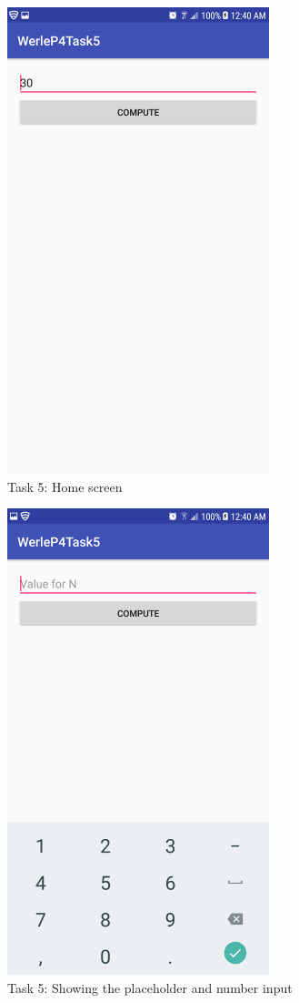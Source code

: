 \documentclass[11pt]{article}
\begin{document}
		\begin{figure}[ht]
			\includegraphics[width=3in]{img/t5s1.png}
			\centering
			\caption{Task 5: Home screen}
		\end{figure}
		\begin{figure}[ht]
			\includegraphics[width=3in]{img/t5s2.png}
			\centering
			\caption{Task 5: Showing the placeholder and number input}
		\end{figure}
\end{document}

